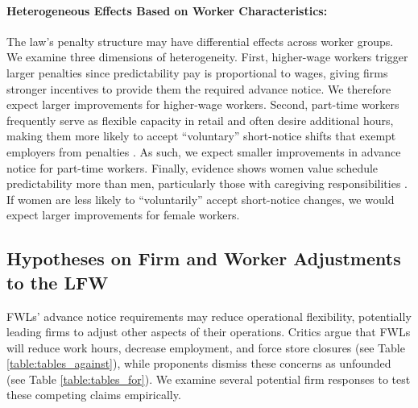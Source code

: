 \documentclass[letterpaper,11pt,leqno]{article}
\theoremstyle{paper}
\begin{document}
\paragraph{Heterogeneous Effects Based on Worker Characteristics:}
The law's penalty structure may have differential effects across worker groups. We examine three dimensions of heterogeneity. First, higher-wage workers trigger larger penalties since predictability pay is proportional to wages, giving firms stronger incentives to provide them the required advance notice. We therefore expect larger improvements for higher-wage workers. Second, part-time workers frequently serve as flexible capacity in retail and often desire additional hours, making them more likely to accept ``voluntary'' short-notice shifts that exempt employers from penalties \citep{lambert_2008,kalleberg2009precarious}. As such, we expect smaller improvements in advance notice for part-time workers. Finally, evidence shows women value schedule predictability more than men, particularly those with caregiving responsibilities \citep{mas2017valuing,wiswall2018preference}. If women are less likely to ``voluntarily'' accept short-notice changes, we would expect larger improvements for female workers.


\subsection{Hypotheses on Firm and Worker Adjustments to the LFW}

FWLs' advance notice requirements may reduce operational flexibility, potentially leading firms to adjust other aspects of their operations. Critics argue that FWLs will reduce work hours, decrease employment, and force store closures \citep{yelowitz_2022} (see Table \ref{table:tables_against}), while proponents dismiss these concerns as unfounded (see Table \ref{table:tables_for}). We examine several potential firm responses to test these competing claims empirically.
\end{document}
